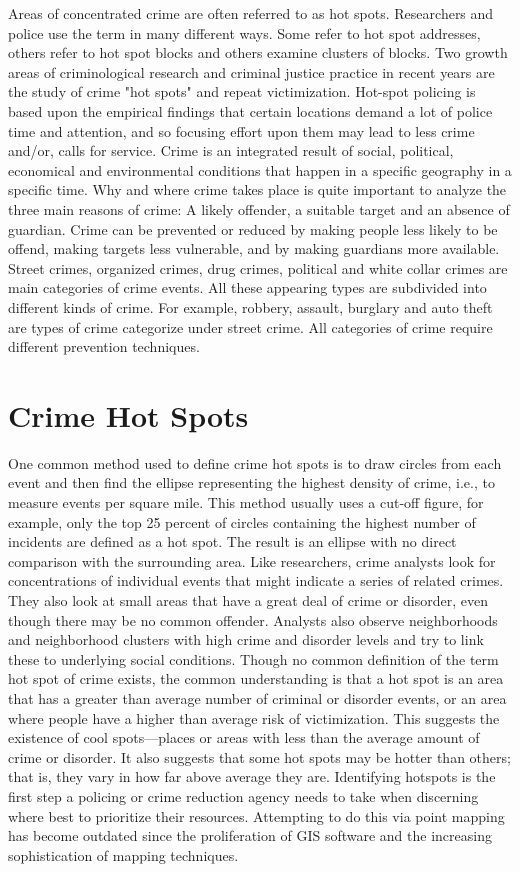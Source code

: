 Areas of concentrated crime are often referred to as hot spots. Researchers and police use the term in many different ways. Some refer to hot spot addresses, others refer to hot spot blocks and others examine clusters of blocks.  Two growth areas of criminological research and criminal justice practice in recent years are the study of crime "hot spots" and repeat victimization. Hot-spot policing is based upon the empirical findings that certain locations demand a lot of police time and attention, and so focusing effort upon them may lead to less crime and/or, calls for service.
Crime is an integrated result of social, political, economical and environmental conditions that happen in a specific geography in a specific time. Why and where crime takes place is quite important to analyze the three main reasons of crime: A likely offender, a suitable target and an absence of guardian. Crime can be prevented or reduced by making people less likely to be offend, making targets less vulnerable, and by making guardians more available. Street crimes, organized crimes, drug crimes, political and white collar crimes are main categories of crime events. All these appearing types are subdivided into different kinds of crime. For example, robbery, assault, burglary and auto theft are types of crime categorize under street crime. All categories of crime require different prevention techniques.

\section{Crime Hot Spots}
One common method used to define crime hot spots is to draw circles from each event and then find the ellipse representing the highest density of crime, i.e., to measure events per square mile. This method usually uses a cut-off figure, for example, only the top 25 percent of circles containing the highest number of incidents are defined as a hot spot. The result is an ellipse with no direct comparison with the surrounding area. 
Like researchers, crime analysts look for concentrations of individual events that might indicate a series of related crimes. They also look at small areas that have a great deal of crime or disorder, even though there may be no common offender. Analysts also observe neighborhoods and neighborhood clusters with high crime and disorder levels and try to link these to underlying social conditions. 
Though no common definition of the term hot spot of crime exists, the common understanding is that a hot spot is an area that has a greater than average number of criminal or disorder events, or an area where people have a higher than average risk of victimization. This suggests the existence of cool spots—places or areas with less than the average amount of crime or disorder. It also suggests that some hot spots may be hotter than others; that is, they vary in how far above average they are.
Identifying hotspots is the first step a policing or crime reduction agency needs to take when discerning where best to prioritize their resources. Attempting to do this via point mapping has become outdated since the proliferation of GIS software and the increasing sophistication of mapping techniques.


